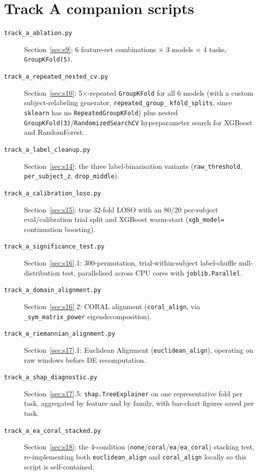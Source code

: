 \documentclass[11pt]{report}
\begin{document}
\section{Track A companion scripts}
\begin{description}
  \item[\texttt{track\_a\_ablation.py}] Section~\ref{sec:s9}: 6 feature-set
        combinations $\times$ 3 models $\times$ 4 tasks, \texttt{GroupKFold(5)}.
  \item[\texttt{track\_a\_repeated\_nested\_cv.py}] Section~\ref{sec:s10}:
        5$\times$-repeated \texttt{GroupKFold} for all 6 models (with a
        custom subject-relabeling generator, \texttt{repeated\_group\_}\linebreak
        \texttt{kfold\_splits}, since \texttt{sklearn} has no
        \texttt{RepeatedGroupKFold}) plus nested
        \texttt{GroupKFold(3)}/\texttt{RandomizedSearchCV} hyperparameter
        search for XGBoost and RandomForest.
  \item[\texttt{track\_a\_label\_cleanup.py}] Section~\ref{sec:s14}: the
        three label-binarisation variants (\texttt{raw\_threshold},
        \texttt{per\_subject\_z}, \texttt{drop\_middle}).
  \item[\texttt{track\_a\_calibration\_loso.py}] Section~\ref{sec:s15}: true
        32-fold LOSO with an 80/20 per-subject eval/calibration trial split
        and XGBoost warm-start (\texttt{xgb\_model=} continuation boosting).
  \item[\texttt{track\_a\_significance\_test.py}] Section~\ref{sec:s16}.1:
        300-permutation, trial-within-subject label-shuffle null-distribution
        test, parallelised across CPU cores with \texttt{joblib.Parallel}.
  \item[\texttt{track\_a\_domain\_alignment.py}] Section~\ref{sec:s16}.2:
        CORAL alignment (\texttt{coral\_align}, via
        \texttt{\_sym\_matrix\_power} eigendecomposition).
  \item[\texttt{track\_a\_riemannian\_alignment.py}] Section~\ref{sec:s17}.1:
        Euclidean Alignment (\texttt{euclidean\_align}), operating on raw
        windows before DE recomputation.
  \item[\texttt{track\_a\_shap\_diagnostic.py}] Section~\ref{sec:s17}.5:
        \texttt{shap.TreeExplainer} on one representative fold per task,
        aggregated by feature and by family, with bar-chart figures saved
        per task.
  \item[\texttt{track\_a\_ea\_coral\_stacked.py}] Section~\ref{sec:s18}: the
        4-condition (\texttt{none}/\texttt{coral}/\texttt{ea}/\texttt{ea\_coral})
        stacking test, re-implementing both \texttt{euclidean\_align} and
        \texttt{coral\_align} locally so this script is self-contained.
\end{description}
\end{document}
